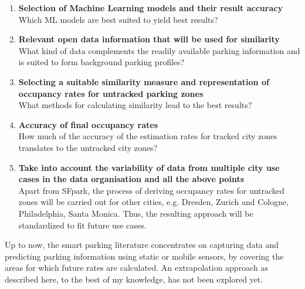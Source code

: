 \documentclass{article}
\begin{document}
\begin{large}
\begin{enumerate}
\item \textbf{Selection of Machine Learning models and their result accuracy}\\
Which ML models are best suited to yield best results?
\vspace{2mm}

\item \textbf{Relevant open data information that will be used for similarity}\\
What kind of data complements the readily available parking information and is suited to form background parking profiles?
\vspace{2mm}

\item \textbf{Selecting a suitable similarity measure and representation of occupancy rates for untracked parking zones}\\
What methods for calculating similarity lead to the best results? 
\vspace{2mm}

\item \textbf{Accuracy of final occupancy rates}\\
How much of the accuracy of the estimation rates for tracked city zones translates to the untracked city zones?
\vspace{2mm}

\item \textbf{Take into account the variability of data from multiple city use cases in the data organisation and all the above points}\\
Apart from SFpark, the process of deriving occupancy rates for untracked zones will be carried out for other cities, e.g. Dresden\cite{dresden}, Zurich\cite{zurich} and Cologne\cite{cologne}, Philadelphia\cite{philly}, Santa Monica\cite{monica}. Thus, the resulting approach will be standardized to fit future use cases.
\vspace{2mm}

\end{enumerate}

Up to now, the smart parking literature concentrates on capturing data and predicting parking information using static or mobile sensors, by covering the areas for which future rates are calculated\cite{lin}. An extrapolation approach as described here, to the best of my knowledge, has not been explored yet.


\end{large}
\end{document}
